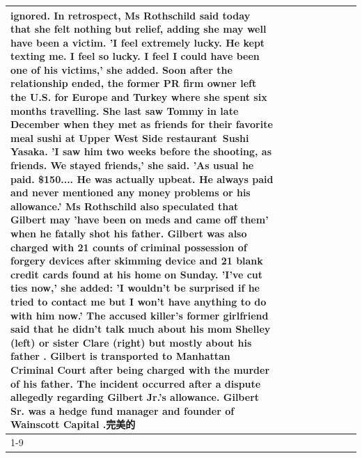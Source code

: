 \begin{table}[H]
\begin{tabular}{lllrlllll}
ignored. In retrospect, Ms Rothschild said today that she felt nothing but relief, adding she may well have been a victim. 'I feel extremely lucky. He kept texting me. I feel so lucky. I feel I could have been one of his victims,' she added. Soon after the relationship ended, the former PR firm owner left the U.S. for Europe and Turkey where she spent six months  travelling. She last saw Tommy in late December when they met as friends for their favorite meal sushi at Upper West Side restaurant Sushi Yasaka. 'I saw him two weeks before the shooting, as friends. We stayed friends,' she said. 'As usual he paid. \$150.... He was actually upbeat. He always paid and never mentioned any money problems or his allowance.' Ms Rothschild also speculated that Gilbert may 'have been on meds and came off them' when he fatally shot his father. Gilbert was also charged with 21 counts of criminal possession of forgery devices after skimming device and 21 blank credit cards found at his home on Sunday. 'I've cut ties now,' she added: 'I wouldn’t be surprised if he tried to contact me but I won’t have anything to do with him now.' The accused killer's former girlfriend said that he didn't talk much about his mom Shelley (left) or sister Clare (right) but mostly about his father . Gilbert is transported to Manhattan Criminal Court  after being charged with the murder of his father. The incident occurred after a dispute allegedly regarding Gilbert Jr.'s allowance. Gilbert Sr. was a hedge fund manager and founder of Wainscott Capital .完美的 \\
\cline{1-9}

\end{tabular}
\end{table}

